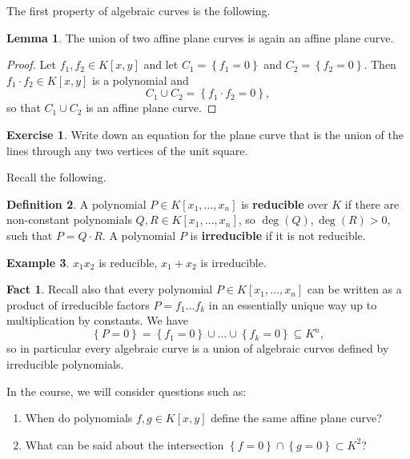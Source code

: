 \documentclass{article}
\newcommand{\rb}[1]{\left( #1 \right)}
\renewcommand{\sb}[1]{\left[ #1 \right]}
\newcommand{\cb}[1]{\left\{ #1 \right\}}
\theoremstyle{definition}\newtheorem{definition}{Definition}[section]
\theoremstyle{definition}\newtheorem{notation}[definition]{Notation}
\theoremstyle{definition}\newtheorem{remark}[definition]{Remark}
\theoremstyle{definition}\newtheorem{example}[definition]{Example}
\theoremstyle{definition}\newtheorem{fact}{Fact}
\theoremstyle{definition}\newtheorem{exercise}{Exercise}
\newtheorem{lemma}[definition]{Lemma}
\begin{document}
The first property of algebraic curves is the following.

\begin{lemma}
\label{lem:1.7}
The union of two affine plane curves is again an affine plane curve.
\end{lemma}

\begin{proof}
Let $ f_1, f_2 \in K\sb{x, y} $ and let $ C_1 = \cb{f_1 = 0} $ and $ C_2 = \cb{f_2 = 0} $. Then $ f_1 \cdot f_2 \in K\sb{x, y} $ is a polynomial and
$$ C_1 \cup C_2 = \cb{f_1 \cdot f_2 = 0}, $$
so that $ C_1 \cup C_2 $ is an affine plane curve.
\end{proof}

\begin{exercise}
Write down an equation for the plane curve that is the union of the lines through any two vertices of the unit square.
\end{exercise}

Recall the following.

\begin{definition}
A polynomial $ P \in K\sb{x_1, \dots, x_n} $ is \textbf{reducible} over $ K $ if there are non-constant polynomials $ Q, R \in K\sb{x_1, \dots, x_n} $, so $ \deg\rb{Q}, \deg\rb{R} > 0 $, such that $ P = Q \cdot R $. A polynomial $ P $ is \textbf{irreducible} if it is not reducible.
\end{definition}

\begin{example}
$ x_1x_2 $ is reducible, $ x_1 + x_2 $ is irreducible.
\end{example}

\begin{fact}
Recall also that every polynomial $ P \in K\sb{x_1, \dots, x_n} $ can be written as a product of irreducible factors $ P = f_1 \dots f_k $ in an essentially unique way up to multiplication by constants. We have
$$ \cb{P = 0} = \cb{f_1 = 0} \cup \dots \cup \cb{f_k = 0} \subseteq K^n, $$ so in particular every algebraic curve is a union of algebraic curves defined by irreducible polynomials.
\end{fact}

In the course, we will consider questions such as:

\begin{enumerate}
\item When do polynomials $ f, g \in K\sb{x, y} $ define the same affine plane curve?
\item What can be said about the intersection $ \cb{f = 0} \cap \cb{g = 0} \subset K^2 $?
\end{enumerate}
\end{document}
